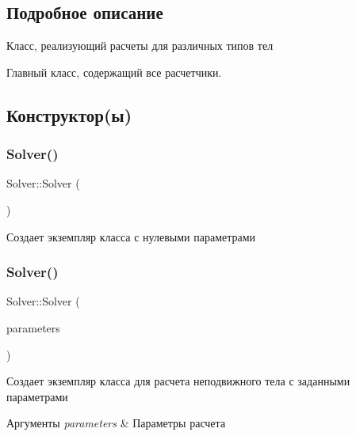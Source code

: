 \subsection{Подробное описание}
Класс, реализующий расчеты для различных типов тел 

Главный класс, содержащий все расчетчики. 

\subsection{Конструктор(ы)}
\mbox{\label{class_solver_a9dfe7ae9ce617e8a6398be34284c907a}} 
\subsubsection{\texorpdfstring{Solver()}{Solver()}\hspace{0.1cm}{\footnotesize\ttfamily [1/3]}}
{\footnotesize\ttfamily Solver\+::\+Solver (\begin{DoxyParamCaption}{ }\end{DoxyParamCaption})}

Создает экземпляр класса с нулевыми параметрами \mbox{\label{class_solver_a27080c3f6ed244ee49f33f7582191363}} 
\subsubsection{\texorpdfstring{Solver()}{Solver()}\hspace{0.1cm}{\footnotesize\ttfamily [2/3]}}
{\footnotesize\ttfamily Solver\+::\+Solver (\begin{DoxyParamCaption}\item[{const \mbox{\hyperlink{struct_solver_parameters}{Solver\+Parameters}} \&}]{parameters }\end{DoxyParamCaption})}

Создает экземпляр класса для расчета неподвижного тела с заданными параметрами 
\begin{DoxyParams}{Аргументы}
{\em parameters} & Параметры расчета \\
\hline
\end{DoxyParams}
\mbox{\label{class_solver_a6af37d6f19720654c973f5e5ddef3dfe}} 
